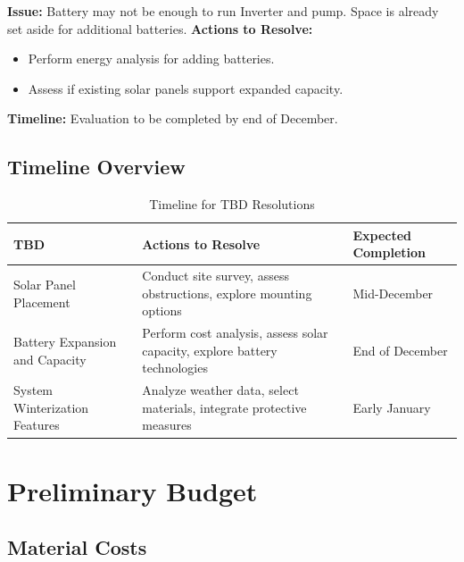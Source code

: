 \documentclass[12pt]{article}
\begin{document}
\textbf{Issue:} Battery may not be enough to run Inverter and pump. Space is already set aside for additional batteries.
\newline
\textbf{Actions to Resolve:}
\begin{itemize}
    \item Perform energy analysis for adding batteries.
    \item Assess if existing solar panels support expanded capacity.
\end{itemize}
\newline
\textbf{Timeline:} Evaluation to be completed by end of December.

\subsection{Timeline Overview}
\label{subsec:timeline_overview}


\begin{table}[H]
    \centering
    \caption{Timeline for TBD Resolutions}
    \label{tab:tdb_timeline}
    \begin{tabular}{|p{4cm}|p{6cm}|p{4cm}|}
    \hline
    \textbf{TBD} & \textbf{Actions to Resolve} & \textbf{Expected Completion} \\
    \hline
    Solar Panel Placement & Conduct site survey, assess obstructions, explore mounting options & Mid-December \\
    \hline
    Battery Expansion and Capacity & Perform cost analysis, assess solar capacity, explore battery technologies & End of December \\
    \hline
    System Winterization Features & Analyze weather data, select materials, integrate protective measures & Early January \\
    \hline
    \end{tabular}
\end{table}

\section{Preliminary Budget}
\label{sec:preliminary_budget}

\subsection{Material Costs}
\end{document}
